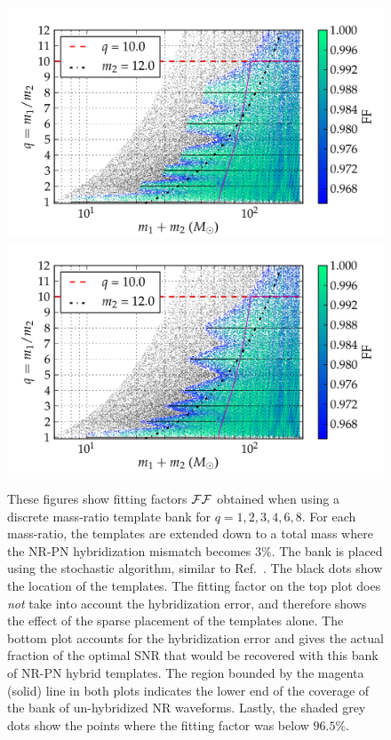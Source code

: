 \begin{figure}
\begin{center}
\includegraphics[width=0.9\columnwidth]{figures/nrhybbank/bank001_lowM_01_stochastic_mtot200_logMq_NOhybMM-tiny.png}
\includegraphics[width=0.9\columnwidth]{figures/nrhybbank/bank001_lowM_01_stochastic_mtot200_logMq_hybMM-tiny.png}
\caption{\label{fig:Current-hybrids-stochastic-FF}These figures show fitting
  factors $\mathcal{FF}$ obtained when using a discrete mass-ratio template bank for
  $q=1,2,3,4,6,8$. For each mass-ratio, the templates are extended down 
  to a total mass where the NR-PN hybridization mismatch becomes
  $3\%$. The bank is placed using the stochastic algorithm, similar to 
  Ref.~\cite{Harry:2009ea,Ajith:2012mn,Manca:2009xw}. 
  The black dots show the location
  of the templates. The fitting factor on the top plot does 
  {\em not} take into account the hybridization error, and therefore shows the
  effect of the sparse placement of the templates alone. 
  The bottom plot accounts for the hybridization error
  and gives the actual fraction of the optimal SNR that would be recovered
  with this bank of NR-PN hybrid templates. The region bounded by the magenta 
  (solid) line in both plots indicates the lower end of the coverage of the 
  bank of un-hybridized NR waveforms. Lastly, the shaded grey dots show the 
  points where the fitting factor was below $96.5\%$.}
\end{center}
\end{figure}
